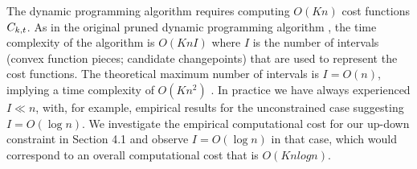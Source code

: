 \documentclass[aoas]{imsart}
\begin{document}
The dynamic programming algorithm requires computing $O(Kn)$ cost
functions $C_{k,t}$. As in the original pruned dynamic programming
algorithm \citep{pruned-dp}, the time complexity of the algorithm is
$O(K n I)$ where $I$ is the number of intervals (convex function
pieces; candidate changepoints) that are used to represent the cost
functions. The theoretical maximum number of intervals is $I=O(n)$,
implying a time complexity of $O(K n^2)$
\citep{pruned-dp-new}. 
In practice we have always experienced $I\ll n$, with, for example,
empirical results for the unconstrained case suggesting $I=O(\log
n)$. We investigate the empirical computational cost for our up-down
constraint in Section 4.1 and observe $I=O(\log n)$ in that case,
which would correspond to an overall computational cost that is
$O(Knlog n)$.
\end{document}
